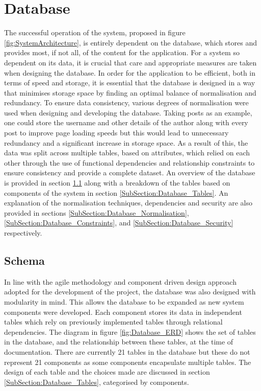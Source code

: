 \section{Database}
The successful operation of the system, proposed in figure \ref{fig:SystemArchitecture}, is entirely dependent on the database, which stores and provides most, if not all, of the content for the application. For a system so dependent on its data, it is crucial that care and appropriate measures are taken when designing the database. In order for the application to be efficient, both in terms of speed and storage, it is essential that the database is designed in a way that minimises storage space by finding an optimal balance of normalisation and redundancy. To ensure data consistency, various degrees of normalisation were used when designing and developing the database. Taking posts as an example, one could store the username and other details of the author along with every post to improve page loading speeds but this would lead to unnecessary redundancy and a significant increase in storage space. As a result of this, the data was split across multiple tables, based on attributes, which relied on each other through the use of functional dependencies and relationship constraints to ensure consistency and provide a complete dataset. An overview of the database is provided in section \ref{SubSection:Database_Schema} along with a breakdown of the tables based on components of the system in section \ref{SubSection:Database_Tables}. An explanation of the normalisation techniques, dependencies and security are also provided in sections \ref{SubSection:Database_Normalisation}, \ref{SubSection:Database_Constraints}, and \ref{SubSection:Database_Security} respectively.

\subsection{Schema}
\label{SubSection:Database_Schema}
In line with the agile methodology and component driven design approach adopted for the development of the project, the database was also designed with modularity in mind. This allows the database to be expanded as new system components were developed. Each component stores its data in independent tables which rely on previously implemented tables through relational dependencies. The diagram in figure \ref{fig:Database_ERD} shows the set of tables in the database, and the relationship between these tables, at the time of documentation. There are currently 21 tables in the database but these do not represent 21 components as some components encapsulate multiple tables. The design of each table and the choices made are discussed in section \ref{SubSection:Database_Tables}, categorised by components.

